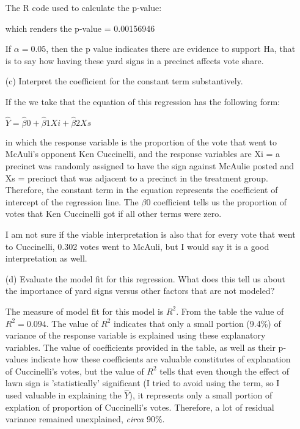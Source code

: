 \documentclass[12pt,letterpaper]{article}
\begin{document}
\begin{enumerate}
	The R code used to calculate the p-value:
	
	  
	
	which renders the p-value = 0.00156946
	
	If $\alpha = 0.05$, then the p value indicates there are evidence to support Ha, that is to say how having these yard signs in a precinct affects vote share. 
	
	\vspace{2cm}
	\item [(c)] Interpret the coefficient for the constant term substantively.
	\vspace{1cm}
	
	If the we take that the equation of this regression has the following form: 
	
	$\hat{Y} = \hat{\beta}0 + \hat{\beta}1Xi + \hat{\beta}2Xs$
	
	in which the response variable is the proportion of the vote that went to McAuli's opponent Ken Cuccinelli, and the response variables are Xi = a precinct was randomly assigned to have the sign against McAulie posted and Xs = precinct that was adjacent to a precinct in the treatment group. Therefore, the constant term in the equation represents the coefficient of intercept of the regression line. The $\beta0$ coefficient tells us the proportion of votes that Ken Cuccinelli got if all other terms were zero.
	
	I am not sure if the viable interpretation is also that for every vote that went to Cuccinelli, 0.302 votes went to McAuli, but I would say it is a good interpretation as well.         
	
	\item [(d)] Evaluate the model fit for this regression.  What does this	tell us about the importance of yard signs versus other factors that are not modeled?
	
	The measure of model fit for this model is $R^2$. From the table the value of $R^2 = 0.094$. The value of $R^2$ indicates that only a small portion (9.4\%) of variance of the response variable is explained using these explanatory variables. The value of coefficients provided in the table, as well as their p-values indicate how these coefficients are valuable constitutes of explanation of Cuccinelli's votes, but the value of $R^2$ tells that even though the effect of lawn sign is 'statistically' significant (I tried to avoid using the term, so I used valuable in explaining the $\hat{Y}$), it represents only a small portion of explation of proportion of Cuccinelli's votes. Therefore, a lot of residual variance remained unexplained, \textit{circa} 90\%.        
		  
	
\end{enumerate}  
\end{document}
